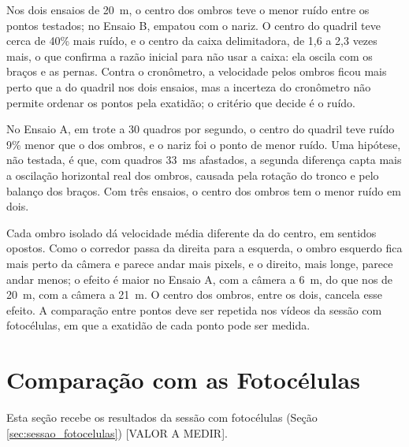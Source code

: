 \documentclass[
    12pt,               %
    openright,          %
    twoside,            %
    a4paper,            %
    chapter=TITLE,      %
    english,            %
    brazil              %
    ]{abntex2}
\begin{document}
Nos dois ensaios de 20~m, o centro dos ombros teve o menor ruído entre os pontos testados; no Ensaio B, empatou com o nariz. O centro do quadril teve cerca de 40\% mais ruído, e o centro da caixa delimitadora, de 1,6 a 2,3 vezes mais, o que confirma a razão inicial para não usar a caixa: ela oscila com os braços e as pernas. Contra o cronômetro, a velocidade pelos ombros ficou mais perto que a do quadril nos dois ensaios, mas a incerteza do cronômetro não permite ordenar os pontos pela exatidão; o critério que decide é o ruído.

No Ensaio A, em trote a 30 quadros por segundo, o centro do quadril teve ruído 9\% menor que o dos ombros, e o nariz foi o ponto de menor ruído. Uma hipótese, não testada, é que, com quadros 33~ms afastados, a segunda diferença capta mais a oscilação horizontal real dos ombros, causada pela rotação do tronco e pelo balanço dos braços. Com três ensaios, o centro dos ombros tem o menor ruído em dois.

Cada ombro isolado dá velocidade média diferente da do centro, em sentidos opostos. Como o corredor passa da direita para a esquerda, o ombro esquerdo fica mais perto da câmera e parece andar mais pixels, e o direito, mais longe, parece andar menos; o efeito é maior no Ensaio A, com a câmera a 6~m, do que nos de 20~m, com a câmera a 21~m. O centro dos ombros, entre os dois, cancela esse efeito. A comparação entre pontos deve ser repetida nos vídeos da sessão com fotocélulas, em que a exatidão de cada ponto pode ser medida.

\section{Comparação com as Fotocélulas}
\label{sec:resultado_fotocelula}

Esta seção recebe os resultados da sessão com fotocélulas (Seção \ref{sec:sessao_fotocelulas}) [VALOR A MEDIR].
\end{document}
